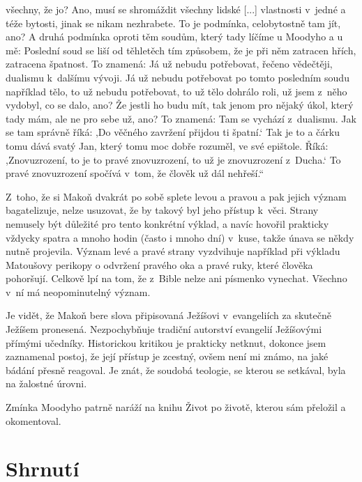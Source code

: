 \begin{enumerate}
{{všechny, že jo? Ano, musí se shromáždit všechny lidské [...]
vlastnosti v~jedné a téže bytosti, jinak se nikam nezhrabete. To
je podmínka, celobytostně tam jít, ano? A druhá podmínka oproti těm soudům,
který tady líčíme u Moodyho a u mě: Poslední soud se liší od těhletěch tím
způsobem, že je při něm zatracen hřích, zatracena špatnost. To znamená: Já už
nebudu potřebovat, řečeno vědečtěji, dualismu k~dalšímu vývoji. Já už nebudu
potřebovat po tomto posledním soudu například tělo, to už nebudu potřebovat, to
už tělo dohrálo roli, už jsem z~něho vydobyl, co se dalo, ano? Že jestli ho budu
mít, tak jenom pro nějaký úkol, který tady mám, ale ne pro sebe už, ano? To
znamená: Tam se vychází z~dualismu. Jak se tam správně říká: ,Do věčného
zavržení přijdou ti špatní.` Tak je to a čárku tomu dává svatý Jan, který tomu
moc dobře rozuměl, ve své epištole. Říká: ,Znovuzrození, to je to pravé
znovuzrození, to už je znovuzrození z~Ducha.` To pravé znovuzrození spočívá
v~tom, že člověk už dál nehřeší.``
}

Z~toho, že si Makoň dvakrát po sobě splete levou a pravou a pak jejich význam
bagatelizuje, nelze usuzovat, že by takový byl jeho přístup k~věci. Strany
nemusely být důležité pro tento konkrétní výklad, a navíc hovořil prakticky
vždycky spatra a mnoho hodin (často i mnoho dní) v~kuse, takže únava se někdy
nutně projevila. Význam levé a pravé strany vyzdvihuje například při výkladu
Matoušovy perikopy o odvržení pravého oka a pravé ruky, které člověka pohoršují.
Celkově lpí na tom, že z~Bible nelze ani písmenko vynechat. Všechno v~ní má
neopominutelný význam.

Je vidět, že Makoň bere slova připisovaná Ježíšovi v~evangeliích za skutečně
Ježíšem pronesená. Nezpochybňuje tradiční autorství evangelií Ježíšovými přímými
učedníky. Historickou kritikou je prakticky netknut, dokonce jsem zaznamenal
postoj, že její přístup je zcestný, ovšem není mi známo, na jaké bádání přesně
reagoval. Je znát, že soudobá teologie, se kterou se setkával, byla na žalostné
úrovni.

Zmínka Moodyho patrně naráží na knihu Život po životě\cite{moody1975life},
kterou sám přeložil a okomentoval\cite{KaMaMoody}.

}

\end{enumerate}

\section{Shrnutí}

